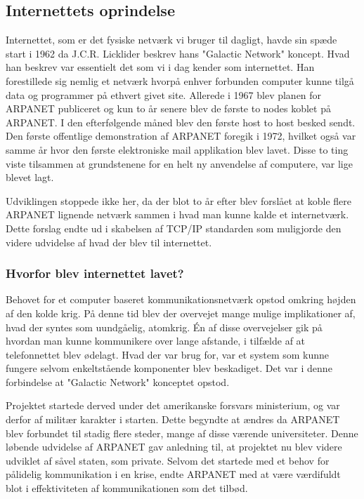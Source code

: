 \newpage
\subsection{Internettets oprindelse}
Internettet, som er det fysiske netværk vi bruger til dagligt, havde sin spæde start i 1962 da J.C.R. Licklider beskrev hans "Galactic Network" koncept. Hvad han beskrev var essentielt det som vi i dag kender som internettet. Han forestillede sig nemlig et netværk hvorpå enhver forbunden computer kunne tilgå data og programmer på ethvert givet site. Allerede i 1967 blev planen for ARPANET publiceret og kun to år senere blev de første to nodes koblet på ARPANET. I den efterfølgende måned blev den første host to host besked sendt. Den første offentlige demonstration af ARPANET foregik i 1972, hvilket også var samme år hvor den første elektroniske mail applikation blev lavet. 
Disse to ting viste tilsammen at grundstenene for en helt ny anvendelse af computere, var lige blevet lagt.\cite{brief_history_of_the_internet}

Udviklingen stoppede ikke her, da der blot to år efter blev forslået at koble flere ARPANET lignende netværk sammen i hvad man kunne kalde et internetværk. Dette forslag endte ud i skabelsen af TCP/IP standarden som muligjorde den videre udvidelse af hvad der blev til internettet.\cite{The_development_of_the_internet}

\subsubsection{Hvorfor blev internettet lavet?}
Behovet for et computer baseret kommunikationsnetværk opstod omkring højden af den kolde krig. På denne tid blev der overvejet mange mulige implikationer af, hvad der syntes som uundgåelig, atomkrig. Én af disse overvejelser gik på hvordan man kunne kommunikere over lange afstande, i tilfælde af at telefonnettet blev ødelagt. Hvad der var brug for, var et system som kunne fungere selvom enkeltstående komponenter blev beskadiget. Det var i denne forbindelse at "Galactic Network" konceptet opstod.\cite{The_Invention_of_the_Internet}

Projektet startede derved under det amerikanske forsvars ministerium, og var derfor af militær karakter i starten. Dette begyndte at ændres da ARPANET blev forbundet til stadig flere steder, mange af disse værende universiteter. Denne løbende udvidelse af ARPANET gav anledning til, at projektet nu blev videre udviklet af såvel staten, som private. Selvom det startede med et behov for pålidelig kommunikation i en krise, endte ARPANET med at være værdifuldt blot i effektiviteten af kommunikationen som det tilbød.